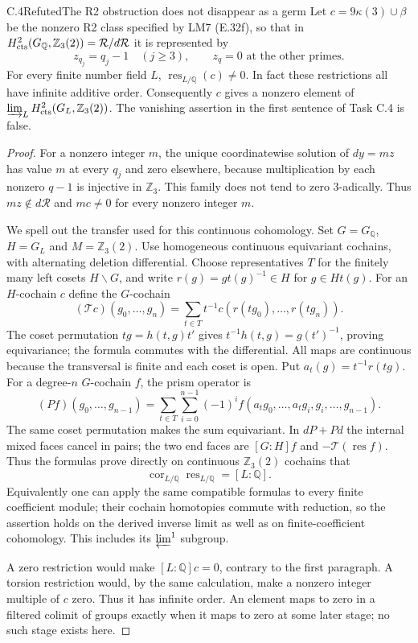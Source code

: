 \begin{statement}{C.4}{Refuted}{The R2 obstruction does not disappear as a germ}
Let $c=9\kappa(3)\cup\beta$ be the nonzero R2 class
specified by LM7 (E.32f), so that in
$H^2_{\rm cts}(G_{\mathbb Q},\mathbb Z_3(2))=
\mathcal R/d\mathcal R$ it is represented by
\[
 z_{q_j}=q_j-1\quad(j\ge3),\qquad z_q=0
                       \text{ at the other primes}.          \tag{C.6}
\]
For every finite number field $L$,
$\operatorname{res}_{L/\mathbb Q}(c)\ne0$.
In fact these restrictions all have infinite additive order.
Consequently $c$ gives a nonzero element of
$\varinjlim_L H^2_{\rm cts}(G_L,\mathbb Z_3(2))$.
The vanishing assertion in the first sentence of Task C.4
is false.
\end{statement}
\begin{proof}
For a nonzero integer $m$, the unique coordinatewise
solution of $dy=mz$ has value $m$ at every $q_j$ and zero
elsewhere, because multiplication by each nonzero
$q-1$ is injective in $\mathbb Z_3$.
This family does not tend to zero $3$-adically.  Thus
$mz\notin d\mathcal R$ and $mc\ne0$ for every nonzero
integer $m$.

We spell out the transfer used for this continuous
cohomology.  Set $G=G_{\mathbb Q}$, $H=G_L$ and
$M=\mathbb Z_3(2)$.  Use homogeneous continuous
equivariant cochains, with alternating deletion
differential.  Choose representatives $T$ for the
finitely many left cosets $H\backslash G$, and write
$r(g)=gt(g)^{-1}\in H$ for $g\in Ht(g)$.
For an $H$-cochain $c$ define the $G$-cochain
\[
 (\mathcal Tc)(g_0,\ldots,g_n)=
 \sum_{t\in T}t^{-1}c(r(tg_0),\ldots,r(tg_n)).              \tag{C.7a}
\]
The coset permutation $tg=h(t,g)t'$ gives
$t^{-1}h(t,g)=g(t')^{-1}$, proving equivariance;
the formula commutes with the differential.
All maps are continuous because the transversal is
finite and each coset is open.  Put
$a_t(g)=t^{-1}r(tg)$.  For a degree-$n$ $G$-cochain $f$,
the prism operator is
\[
 (Pf)(g_0,\ldots,g_{n-1})=
 \sum_{t\in T}\sum_{i=0}^{n-1}(-1)^i
 f(a_tg_0,\ldots,a_tg_i,g_i,\ldots,g_{n-1}).              \tag{C.7b}
\]
The same coset permutation makes the sum equivariant.
In $dP+Pd$ the internal mixed faces cancel in pairs;
the two end faces are $[G:H]f$ and
$-\mathcal T(\operatorname{res}f)$.
Thus the formulas prove directly on continuous
$\mathbb Z_3(2)$ cochains that
\[
 \operatorname{cor}_{L/\mathbb Q}
 \operatorname{res}_{L/\mathbb Q}=[L:\mathbb Q].              \tag{C.7}
\]
Equivalently one can apply the same compatible formulas
to every finite coefficient module; their cochain
homotopies commute with reduction, so the assertion
holds on the derived inverse limit as well as on
finite-coefficient cohomology.  This includes its
$\varprojlim^1$ subgroup.

A zero restriction would make $[L:\mathbb Q]c=0$,
contrary to the first paragraph.  A torsion restriction
would, by the same calculation, make a nonzero integer
multiple of $c$ zero.  Thus it has infinite order.
An element maps to zero in a filtered colimit of groups
exactly when it maps to zero at some later stage;
no such stage exists here.
\end{proof}

